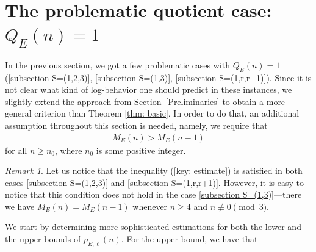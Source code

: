 \documentclass[12pt]{amsart}
\theoremstyle{definition}
\theoremstyle{remark}
\newtheorem*{remark}{Remark}
\numberwithin{theorem}{section} \numberwithin{equation}{section}
\begin{document}
\section{The problematic quotient case: $Q_{E}(n)=1$}\label{Section 5}

In the previous section, we got a few problematic cases with $Q_{E
}\left( n\right) =1$ (\ref{subsection S=(1,2,3)}, \ref{subsection S=(1,3)}, \ref{subsection S=(1,r,r+1)}). Since it is not clear what kind of log-behavior one should predict in these instances, we slightly extend the approach from Section~\ref{Preliminaries}
to obtain a
more general criterion than Theorem \ref{thm: basic}. In order to do that, an additional assumption throughout this section is needed, namely, we require that 
\begin{align}\label{key: estimate}
M_E(n)>M_E(n-1)
\end{align}
for all $n\geq n_0$, where $n_0$ is some positive integer.   

\begin{remark}
Let us notice that the inequality (\ref{key: estimate}) is satisfied in both
cases \ref{subsection S=(1,2,3)}
and \ref{subsection S=(1,r,r+1)}.
However, it is easy to notice that this condition does not hold in the
case \ref{subsection S=(1,3)}---there we have $M_E(n)=M_E(n-1)$ whenever
$n\geq4$ and $n\not\equiv0\pmod{3}$.
\end{remark}


We start by determining more sophisticated estimations for both the lower and the upper bounds of $p_{E,\ell }(n)$. For the upper bound, we have that
\end{document}
